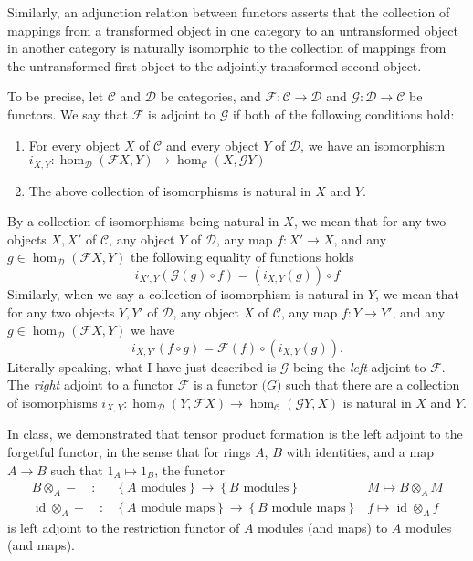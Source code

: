 \documentclass[18pt]{amsart}
\newcommand{\id}{\operatorname{id}}
\begin{document}
	Similarly, an adjunction relation between functors asserts that the collection of mappings from a transformed object in one category to an untransformed object in another category is naturally isomorphic to the collection of mappings from the untransformed first object to the adjointly transformed second object. 
	
	To be precise, let $\mathcal{C}$ and $\mathcal{D}$ be categories, and $\mathcal{F}:\mathcal{C}\to\mathcal{D}$ and $\mathcal{G}:\mathcal{D}\to\mathcal{C}$ be functors. We say that $\mathcal{F}$ is adjoint to $\mathcal{G}$  if both of the following conditions hold:
	\begin{enumerate}
		\item	For every object $X$ of $\mathcal{C}$ and every object $Y$ of $\mathcal{D}$, we have an isomorphism $i_{X,Y}: \hom_\mathcal{D}(\mathcal{F} X,Y) \to \hom_\mathcal{C} (X,\mathcal{G}Y)$
		\item The above collection of isomorphisms is natural in $X$ and $Y$.
	\end{enumerate}
By a collection of isomorphisms being natural in $X$, we mean that for any two objects $X,X'$ of $\mathcal{C}$, any object $Y$ of $\mathcal{D}$, any map $f:X'\to X$, and any $g \in \hom_\mathcal{D}(\mathcal{F} X,Y)$ the following equality of functions holds
	\begin{equation*}
		i_{X',Y}(\mathcal{G}(g)\circ f)=(i_{X,Y}(g))\circ f
	\end{equation*}
Similarly, when we say a collection of isomorphism is natural in $Y$, we mean that for any two objects $Y,Y'$ of $\mathcal{D}$, any object $X$ of $\mathcal{C}$, any map $f:Y\to Y'$, and any $g\in \hom_{\mathcal{D}}(\mathcal{F}X,Y)$ we have
	\begin{equation*}
		 i_{X,Y'}(f \circ g) =\mathcal{F}(f)\circ (i_{X,Y}(g)).
	\end{equation*}
Literally speaking, what I have just described is $\mathcal{G}$ being the \emph{left} adjoint to $\mathcal{F}$. The \emph{right} adjoint to a functor $\mathcal{F}$  is a functor $\mathcal(G)$ such that there are a collection of isomorphisms $i_{X,Y}:\hom_\mathcal{D}(Y,\mathcal{F}X)\to \hom_\mathcal{C}(\mathcal{G}Y,X)$ is natural in $X$ and $Y$.

	In class, we demonstrated that tensor product formation is the left adjoint to the forgetful functor, in the sense that for rings $A$, $B$ with identities, and a map $A \to B$ such that $1_A \mapsto 1_B$, the functor 
		\begin{align*}
			 B\otimes_A -  \quad :& \left \{ A \text{ modules} \right \} \to \left \{ B \text{ modules} \right \} 				 & M \mapsto B\otimes_A M\\
			 \id \otimes_A -  \quad :& \left \{ A \text{ module maps} \right \} \to \left \{ B \text{ module maps} \right \}		            & f \mapsto  \id \otimes_A f
		\end{align*}
is left adjoint to the restriction functor of $A$ modules (and maps) to $A$ modules (and maps).
\end{document}
